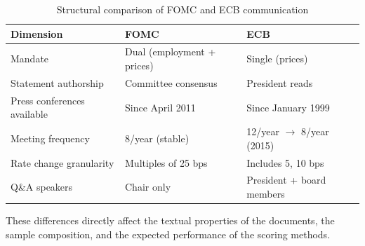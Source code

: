 \begin{table}[htbp]
\centering
\caption{Structural comparison of FOMC and ECB communication}
\label{tab:inst_comparison}
\begin{threeparttable}
\begin{tabular}{lll}
\toprule
Dimension & FOMC & ECB \\
\midrule
Mandate
  & Dual (employment + prices)
  & Single (prices) \\
Statement authorship
  & Committee consensus
  & President reads \\
Press conferences available
  & Since April 2011
  & Since January 1999 \\
Meeting frequency
  & 8/year (stable)
  & 12/year $\to$ 8/year (2015) \\
Rate change granularity
  & Multiples of 25 bps
  & Includes 5, 10 bps \\
Q\&A speakers
  & Chair only
  & President + board members \\
\bottomrule
\end{tabular}
\begin{tablenotes}\footnotesize
  \item[] These differences directly affect the textual properties
    of the documents, the sample composition, and the expected
    performance of the scoring methods.
\end{tablenotes}
\end{threeparttable}
\end{table}


